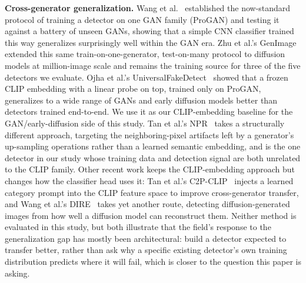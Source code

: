 \documentclass[3p,times,procedia]{elsarticle}
\begin{document}
\textbf{Cross-generator generalization.} Wang et al.~\cite{wang2020cnndetect}
established the now-standard protocol of training a detector on one GAN
family (ProGAN) and testing it against a battery of unseen GANs, showing
that a simple CNN classifier trained this way generalizes surprisingly
well within the GAN era. Zhu et al.'s GenImage~\cite{genimage2023} extended
this same train-on-one-generator, test-on-many protocol to diffusion
models at million-image scale and remains the training source for three of
the five detectors we evaluate. Ojha et al.'s UniversalFakeDetect~\cite{ojha2023universal}
showed that a frozen CLIP embedding with a linear probe on top,
trained only on ProGAN, generalizes to a wide range of GANs and early
diffusion models better than detectors trained end-to-end. We use it as
our CLIP-embedding baseline for the GAN/early-diffusion side of this
study. Tan et al.'s NPR~\cite{tan2024npr} takes a structurally different
approach, targeting the neighboring-pixel artifacts left by a generator's
up-sampling operations rather than a learned semantic embedding, and is
the one detector in our study whose training data and detection signal
are both unrelated to the CLIP family. Other recent work keeps the
CLIP-embedding approach but changes how the classifier head uses it:
Tan et al.'s C2P-CLIP~\cite{tan2025c2pclip} injects a learned category
prompt into the CLIP feature space to improve cross-generator transfer,
and Wang et al.'s DIRE~\cite{wang2023dire} takes yet another route,
detecting diffusion-generated images from how well a diffusion model can
reconstruct them. Neither method is evaluated in this study, but both
illustrate that the field's response to the generalization gap has mostly
been architectural: build a detector expected to transfer better, rather
than ask why a specific existing detector's own training distribution
predicts where it will fail, which is closer to the question this paper
is asking.
\end{document}

